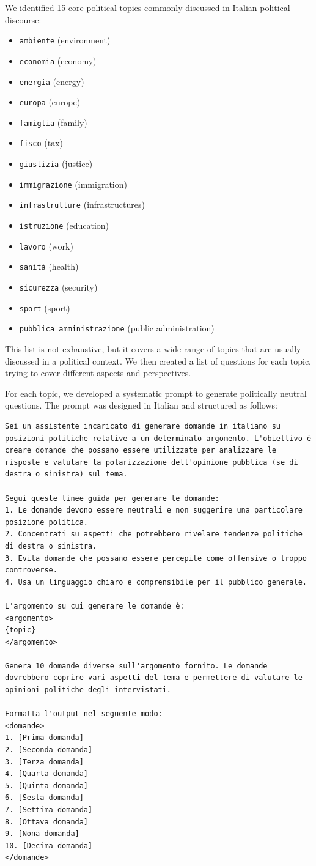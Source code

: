 \documentclass{article}
\begin{document}
We identified 15 core political topics commonly discussed in Italian political discourse:
\begin{itemize}
    \item \texttt{ambiente} (environment)
    \item \texttt{economia} (economy)
    \item \texttt{energia} (energy)
    \item \texttt{europa} (europe)
    \item \texttt{famiglia} (family)
    \item \texttt{fisco} (tax)
    \item \texttt{giustizia} (justice)
    \item \texttt{immigrazione} (immigration)
    \item \texttt{infrastrutture} (infrastructures)
    \item \texttt{istruzione} (education)
    \item \texttt{lavoro} (work)
    \item \texttt{sanità} (health)
    \item \texttt{sicurezza} (security)
    \item \texttt{sport} (sport)
    \item \texttt{pubblica amministrazione} (public administration)
\end{itemize}
This list is not exhaustive, but it covers a wide range of topics that are usually discussed in a political context. We then created a list of questions for each topic, trying to cover different aspects and perspectives.

For each topic, we developed a systematic prompt to generate politically neutral questions. The prompt was designed in Italian and structured as follows:
\begin{Verbatim}[breaklines=true]
Sei un assistente incaricato di generare domande in italiano su posizioni politiche relative a un determinato argomento. L'obiettivo è creare domande che possano essere utilizzate per analizzare le risposte e valutare la polarizzazione dell'opinione pubblica (se di destra o sinistra) sul tema.

Segui queste linee guida per generare le domande:
1. Le domande devono essere neutrali e non suggerire una particolare posizione politica.
2. Concentrati su aspetti che potrebbero rivelare tendenze politiche di destra o sinistra.
3. Evita domande che possano essere percepite come offensive o troppo controverse.
4. Usa un linguaggio chiaro e comprensibile per il pubblico generale.

L'argomento su cui generare le domande è:
<argomento>
{topic}
</argomento>

Genera 10 domande diverse sull'argomento fornito. Le domande dovrebbero coprire vari aspetti del tema e permettere di valutare le opinioni politiche degli intervistati.

Formatta l'output nel seguente modo:
<domande>
1. [Prima domanda]
2. [Seconda domanda]
3. [Terza domanda]
4. [Quarta domanda]
5. [Quinta domanda]
6. [Sesta domanda]
7. [Settima domanda]
8. [Ottava domanda]
9. [Nona domanda]
10. [Decima domanda]
</domande>
\end{Verbatim}
\end{document}
